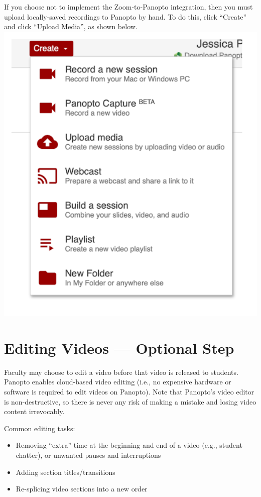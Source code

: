 If you choose not to implement the Zoom-to-Panopto integration, then you must upload locally-saved recordings to Panopto by hand. To do this, click ``Create'' and click ``Upload Media'', as shown below.
{
	\centering
	\includegraphics[scale=0.6]{panopto/media/07-create.png}
}


\section{Editing Videos --- Optional Step}
\label{sec:panopto:editing_videos}

Faculty may choose to edit a video before that video is released to students. Panopto enables cloud-based video editing (i.e., no expensive hardware or software is required to edit videos on Panopto). Note that Panopto’s video editor is non-destructive, so there is never any risk of making a mistake and losing video content irrevocably.

Common editing tasks:
\begin{itemize}
	\item Removing ``extra'' time at the beginning and end of a video (e.g., student chatter), or unwanted pauses and interruptions
	\item Adding section titles/transitions
	\item Re-splicing video sections into a new order
\end{itemize}

